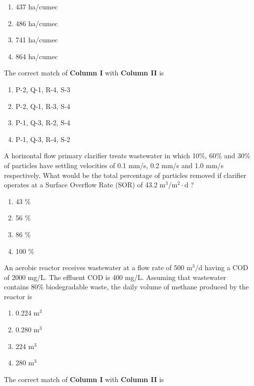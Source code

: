  \begin{enumerate}
     \item 437 ha/cumec
     \item 486 ha/cumec
     \item 741 ha/cumec
     \item 864 ha/cumec \\
 \end{enumerate}
\item The correct match of \textbf{Column I} with \textbf{Column II} is 
\begin{table}[h!]
  \centering
  
\end{table} 
\begin{enumerate}
    \item P-2, Q-1, R-4, S-3
    \item P-2, Q-1, R-3, S-4
    \item P-1, Q-3, R-2, S-4
    \item P-1, Q-3, R-4, S-2 \\
\end{enumerate}
\item A horizontal flow primary clarifier treats wastewater in which 10\%, 60\% and 30\% of particles have settling velocities of 0.1 mm/s, 0.2 mm/s and 1.0 mm/s respectively. What would be the total percentage of particles removed if clarifier operates at a Surface Overflow Rate (SOR) of 43.2 $\text{m}^3/\text{m}^2\cdot$d ?
\begin{enumerate}
    \item 43 \%
    \item 56 \%
    \item 86 \%
    \item 100 \% \\
\end{enumerate}
\item An aerobic reactor receives wastewater at a flow rate of 500 $\text{m}^3$/d having a COD of 2000 mg/L. The effluent COD is 400 mg/L. Assuming that wastewater contains 80\% biodegradable waste, the daily volume of methane produced by the reactor is
\begin{enumerate}
    \item 0.224 $\text{m}^3$
    \item 0.280 $\text{m}^3$
    \item 224 $\text{m}^3$
    \item 280 $\text{m}^3$ \\
\end{enumerate}
\item The correct match of \textbf{Column I} with \textbf{Column II} is
